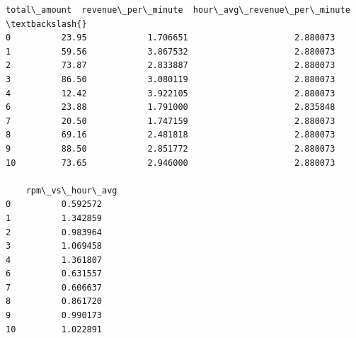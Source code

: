 \documentclass[11pt]{article}
\begin{document}
\begin{Verbatim}[commandchars=\\\{\}]
    total\_amount  revenue\_per\_minute  hour\_avg\_revenue\_per\_minute  \textbackslash{}
0          23.95            1.706651                     2.880073
1          59.56            3.867532                     2.880073
2          73.87            2.833887                     2.880073
3          86.50            3.080119                     2.880073
4          12.42            3.922105                     2.880073
6          23.88            1.791000                     2.835848
7          20.50            1.747159                     2.880073
8          69.16            2.481818                     2.880073
9          88.50            2.851772                     2.880073
10         73.65            2.946000                     2.880073

    rpm\_vs\_hour\_avg
0          0.592572
1          1.342859
2          0.983964
3          1.069458
4          1.361807
6          0.631557
7          0.606637
8          0.861720
9          0.990173
10         1.022891
    \end{Verbatim}
\end{document}
